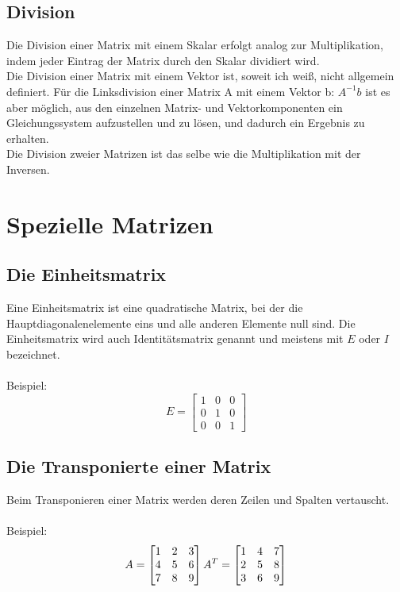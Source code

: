 \documentclass[11pt]{scrreprt}
\begin{document}
\subsection{Division}
Die Division einer Matrix mit einem Skalar erfolgt analog zur Multiplikation, indem jeder Eintrag der Matrix durch den Skalar dividiert wird.\\
Die Division einer Matrix mit einem Vektor ist, soweit ich weiß, nicht allgemein definiert. Für die Linksdivision einer Matrix A mit einem Vektor b: $A^{-1}b$ ist es aber möglich, aus den einzelnen Matrix- und Vektorkomponenten ein Gleichungssystem aufzustellen und zu lösen, und dadurch ein Ergebnis zu erhalten.\\
Die Division zweier Matrizen ist das selbe wie die Multiplikation mit der Inversen.

\section{Spezielle Matrizen}
\subsection{Die Einheitsmatrix}
Eine Einheitsmatrix ist eine quadratische Matrix, bei der die Hauptdiagonalenelemente eins und alle anderen Elemente null sind.
Die Einheitsmatrix wird auch Identitätsmatrix genannt und meistens mit $E$ oder $I$ bezeichnet.\\
\\
Beispiel:
\begin{equation}
E =
\begin{bmatrix}
1 & 0 & 0 \\
0 & 1 & 0 \\
0 & 0 & 1 
\end {bmatrix}
\end{equation}
\subsection{Die Transponierte einer Matrix}
Beim Transponieren einer Matrix werden deren Zeilen und Spalten vertauscht.\\
\\
Beispiel:
\begin{equation}
A =
\begin{bmatrix}
1 & 2 & 3 \\
4 & 5 & 6 \\
7 & 8 & 9 
\end {bmatrix}\\
\\
\\
\\
A^T = 
\begin{bmatrix}
1 & 4 & 7 \\
2 & 5 & 8 \\
3 & 6 & 9 
\end {bmatrix}
\end{equation}
\end{document}
